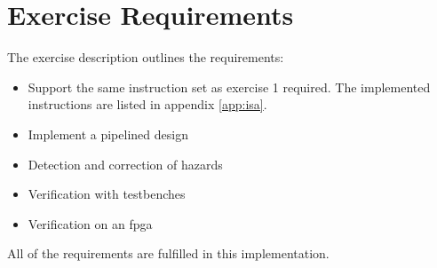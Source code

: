 \section{Exercise Requirements}
The exercise description outlines the requirements\cite[Section 5.3]{bib:compendium}:

\begin{itemize}
    \item   Support the same instruction set as exercise 1 required\cite[Section 4.3]{bib:compendium}.
    The implemented instructions are listed in appendix \ref{app:isa}.
    \item   Implement a pipelined design
    \item   Detection and correction of hazards
    \item   Verification with testbenches
    \item   Verification on an \gls{fpga}
\end{itemize}

\noindent
All of the requirements are fulfilled in this implementation.
